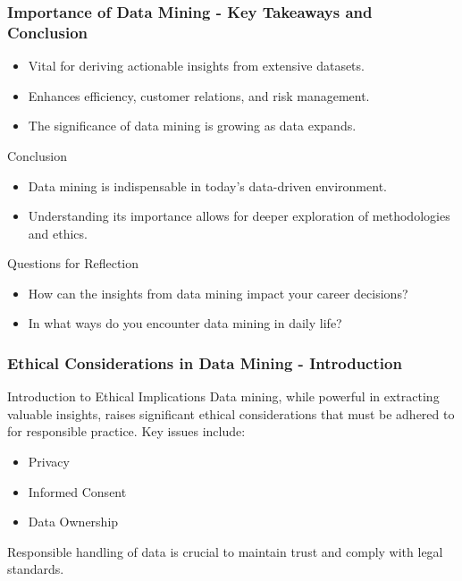 \documentclass[aspectratio=169]{beamer}
\begin{document}
\begin{frame}[fragile]
    \frametitle{Importance of Data Mining - Key Takeaways and Conclusion}
    \begin{itemize}
        \item Vital for deriving actionable insights from extensive datasets.
        \item Enhances efficiency, customer relations, and risk management.
        \item The significance of data mining is growing as data expands.
    \end{itemize}

    \begin{block}{Conclusion}
        \begin{itemize}
            \item Data mining is indispensable in today's data-driven environment.
            \item Understanding its importance allows for deeper exploration of methodologies and ethics.
        \end{itemize}
    \end{block}
    
    \begin{block}{Questions for Reflection}
        \begin{itemize}
            \item How can the insights from data mining impact your career decisions?
            \item In what ways do you encounter data mining in daily life?
        \end{itemize}
    \end{block}
\end{frame}

\begin{frame}[fragile]
    \frametitle{Ethical Considerations in Data Mining - Introduction}
    \begin{block}{Introduction to Ethical Implications}
        Data mining, while powerful in extracting valuable insights, raises significant ethical considerations that must be adhered to for responsible practice. Key issues include:
        \begin{itemize}
            \item Privacy
            \item Informed Consent
            \item Data Ownership
        \end{itemize}
        Responsible handling of data is crucial to maintain trust and comply with legal standards.
    \end{block}
\end{frame}
\end{document}

